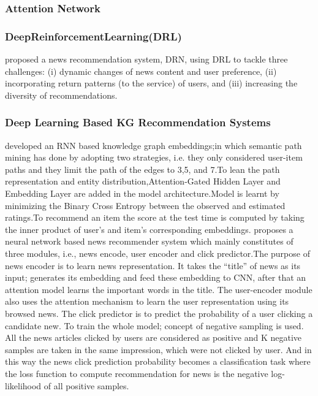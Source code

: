\subsubsection{Attention Network}
\subsubsection{DeepReinforcementLearning(DRL)}
\cite{N67}proposed a news recommendation system, DRN, using DRL to tackle three challenges: (i) dynamic changes of news content and user preference, (ii) incorporating return patterns (to the service) of users, and (iii) increasing the diversity of recommendations.
\subsubsection{Deep Learning Based KG Recommendation Systems}

\cite{N17} developed an RNN based knowledge graph embeddings;in which semantic path mining has done by adopting two strategies, i.e. they only considered user-item paths and they limit the path of the edges to 3,5, and 7.To lean the path representation and entity distribution,Attention-Gated Hidden Layer and Embedding Layer are added in the model architecture.Model is learnt by minimizing the Binary Cross Entropy  between the observed and estimated ratings.To recommend an item the score at the test time is computed by taking the inner product of user's and item's corresponding embeddings.
\cite{N33}
proposes a neural network based news recommender system which mainly constitutes of three modules, i.e., news encode, user encoder and click predictor.The purpose of news encoder is to learn news representation. It takes the “title” of news as its input; generates its embedding and feed these embedding to CNN, after that an attention model learns the important words in the title. The user-encoder module also uses the attention mechanism to learn the user representation using its browsed news. The click predictor is to predict the probability of a user clicking a candidate new. To train the whole model; concept of negative sampling is used. All the news articles clicked by users are considered as positive and K negative samples are taken in the same impression, which were not clicked by user. And in this way the news click prediction probability becomes a classification task where the loss function to compute recommendation for news is the negative log-likelihood of all positive samples.
\\
